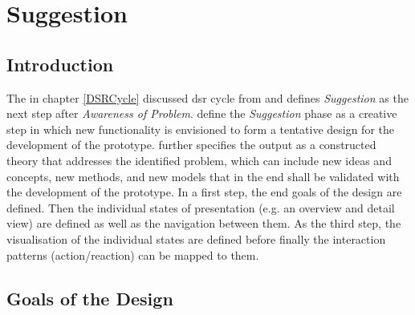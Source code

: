
\chapter{Suggestion} %

\label{ChapterSuggestion} %


\section{Introduction}

The in chapter \ref{DSRCycle} discussed \gls{dsr} cycle from \cite{Vaishnavi2008} and \cite{Hevner2010} defines \textit{Suggestion} as the next step after \textit{Awareness of Problem}. \newline
\cite{Vaishnavi2008} define the \textit{Suggestion} phase as a creative step in which new functionality is envisioned to form a tentative design for the development of the prototype. \cite{Vaishnavi2008} further specifies the output as a constructed theory that addresses the identified problem, which can include new ideas and concepts, new methods, and new models that in the end shall be validated with the development of the prototype. \newline
In a first step, the end goals of the design are defined. Then the individual states of presentation (e.g. an overview and detail view) are defined as well as the navigation between them. As the third step, the visualisation of the individual states are defined before finally the interaction patterns (action/reaction) can be mapped to them.



\section{Goals of the Design}

